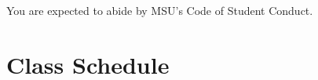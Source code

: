 \documentclass[letterpaper]{inzane_syllabus} %
\begin{document}
You are expected to abide by MSU's Code of Student Conduct.
%
%



\newpage
\makeFullPage
\section{Class Schedule}

\end{document}
